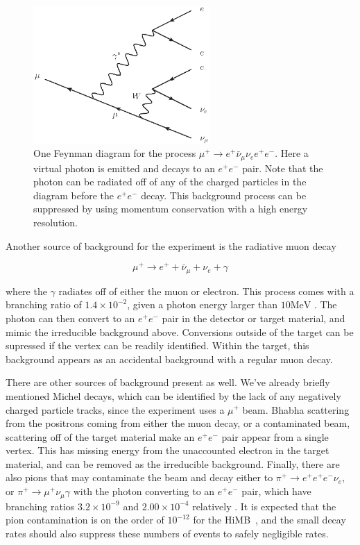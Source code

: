 \begin{figure}[h]
    \centering
    \includegraphics[width = 0.6\textwidth]{Figures/feynman_diagrams/mu_eeenunu_SM.eps}
    \caption{One Feynman diagram for the process $\mu^+ \rightarrow e^+ \bar{\nu}_\mu \nu_e e^+ e^-$. Here a virtual photon is emitted and decays to an $e^+ e^-$ pair. Note that the photon can be radiated off of any of the charged particles in the diagram before the $e^+ e^-$ decay. This background process can be suppressed by using momentum conservation with a high energy resolution.}
    \label{fig:mu_eeenunu_SM}
\end{figure}


Another source of background for the experiment is the radiative muon decay

\begin{equation}
    \mu^+ \rightarrow e^+ + \bar{\nu}_\mu + \nu_e + \gamma
\end{equation}

\noindent where the $\gamma$ radiates off of either the muon or electron.
This process comes with a branching ratio of $1.4 \times 10^{-2}$, given a photon energy larger than $10\textrm{MeV}$ \cite{Agashe:2014kda}.
The photon can then convert to an $e^+ e^-$ pair in the detector or target material, and mimic the irreducible background above.
Conversions outside of the target can be supressed if the vertex can be readily identified.
Within the target, this background appears as an accidental background with a regular muon decay.

There are other sources of background present as well.
We've already briefly mentioned Michel decays, which can be identified by the lack of any negatively charged particle tracks, since the experiment uses a $\mu^+$ beam.
Bhabha scattering from the positrons coming from either the muon decay, or a contaminated beam, scattering off of the target material make an $e^+ e^-$ pair appear from a single vertex.
This has missing energy from the unaccounted electron in the target material, and can be removed as the irreducible background.
Finally, there are also pions that may contaminate the beam and decay either to $\pi^+ \rightarrow e^+ e^+ e^- \nu_e$, or $\pi^+ \rightarrow \mu^+ \nu_\mu \gamma$ with the photon converting to an $e^+ e^-$ pair, which have branching ratios $3.2 \times 10^{-9}$ and $2.00 \times 10^{-4}$ relatively \cite{Agashe:2014kda}.
It is expected that the pion contamination is on the order of $10^{-12}$ for the HiMB~\cite{Blondel:2013ia}, and the small decay rates should also suppress these numbers of events to safely negligible rates.


